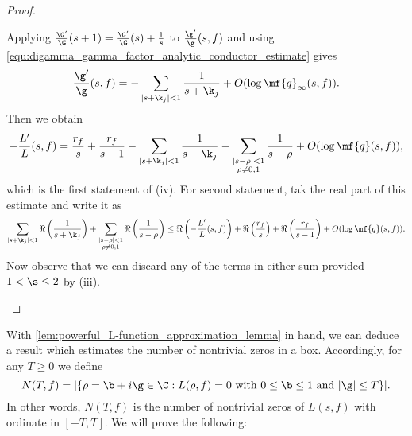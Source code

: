 \begin{proof}
\begin{enumerate}[label=(\roman*)]
\[        \]
        Applying $\frac{\G'}{\G}(s+1) = \frac{\G'}{\G}(s)+\frac{1}{s}$ to $\frac{\g'}{\g}(s,f)$ and using \cref{equ:digamma_gamma_factor_analytic_conductor_estimate} gives
        \[
          \frac{\g'}{\g}(s,f) = -\sum_{|s+\k_{j}| < 1}\frac{1}{s+\k_{j}}+O(\log{\mf{q}_{\infty}(s,f)}).
        \]
        Then we obtain
        \[
          -\frac{L'}{L}(s,f) = \frac{r_{f}}{s}+\frac{r_{f}}{s-1}-\sum_{|s+\k_{j}| < 1}\frac{1}{s+\k_{j}}-\sum_{\substack{|s-\rho| < 1 \\ \rho \neq 0,1}}\frac{1}{s-\rho}+O(\log{\mf{q}(s,f)}),
        \]
        which is the first statement of (iv). For second statement, tak the real part of this estimate and write it as
        \[
          \sum_{|s+\k_{j}| < 1}\Re\left(\frac{1}{s+\k_{j}}\right)+\sum_{\substack{|s-\rho| < 1 \\ \rho \neq 0,1}}\Re\left(\frac{1}{s-\rho}\right) \le \Re\left(-\frac{L'}{L}(s,f)\right)+\Re\left(\frac{r_{f}}{s}\right)+\Re\left(\frac{r_{f}}{s-1}\right)+O(\log{\mf{q}(s,f)}).
        \]
        Now observe that we can discard any of the terms in either sum provided $1 < \s \le 2$ by (iii).
      \end{enumerate}
    \end{proof}

    With \cref{lem:powerful_L-function_approximation_lemma} in hand, we can deduce a result which estimates the number of nontrivial zeros in a box. Accordingly, for any $T \ge 0$ we define
    \[
      N(T,f) = |\{\rho = \b+i\g \in \C:\text{$L(\rho,f) = 0$ with $0 \le \b \le 1$ and $|\g| \le T$}\}|.
    \]
    In other words, $N(T,f)$ is the number of nontrivial zeros of $L(s,f)$ with ordinate in $[-T,T]$. We will prove the following:

